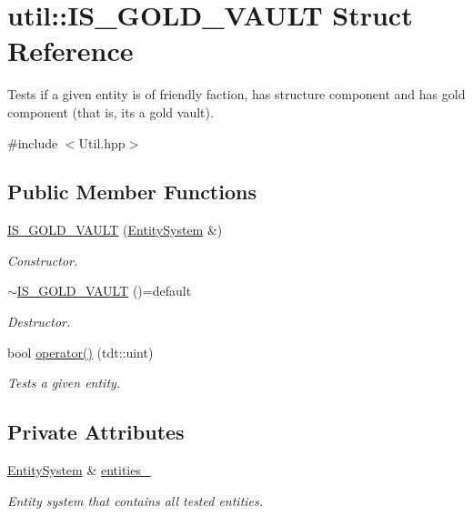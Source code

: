 \hypertarget{structutil_1_1_i_s___g_o_l_d___v_a_u_l_t}{}\section{util\+:\+:I\+S\+\_\+\+G\+O\+L\+D\+\_\+\+V\+A\+U\+LT Struct Reference}
\label{structutil_1_1_i_s___g_o_l_d___v_a_u_l_t}


Tests if a given entity is of friendly faction, has structure component and has gold component (that is, it\textquotesingle{}s a gold vault).  




{\ttfamily \#include $<$Util.\+hpp$>$}

\subsection*{Public Member Functions}
\begin{DoxyCompactItemize}
\item 
\hyperlink{structutil_1_1_i_s___g_o_l_d___v_a_u_l_t_ac01be3840c426cce0fa02387141b1cd1}{I\+S\+\_\+\+G\+O\+L\+D\+\_\+\+V\+A\+U\+LT} (\hyperlink{class_entity_system}{Entity\+System} \&)
\begin{DoxyCompactList}\small\item\em Constructor. \end{DoxyCompactList}\item 
\hyperlink{structutil_1_1_i_s___g_o_l_d___v_a_u_l_t_a35e9d685a4c8cdb03f619c14c02d930c}{$\sim$\+I\+S\+\_\+\+G\+O\+L\+D\+\_\+\+V\+A\+U\+LT} ()=default
\begin{DoxyCompactList}\small\item\em Destructor. \end{DoxyCompactList}\item 
bool \hyperlink{structutil_1_1_i_s___g_o_l_d___v_a_u_l_t_a081dfc7d8fec36e9199a72e7abaaf443}{operator()} (tdt\+::uint)
\begin{DoxyCompactList}\small\item\em Tests a given entity. \end{DoxyCompactList}\end{DoxyCompactItemize}
\subsection*{Private Attributes}
\begin{DoxyCompactItemize}
\item 
\hyperlink{class_entity_system}{Entity\+System} \& \hyperlink{structutil_1_1_i_s___g_o_l_d___v_a_u_l_t_a69fd1690e96bd7d1d5faaa8972087497}{entities\+\_\+}
\begin{DoxyCompactList}\small\item\em Entity system that contains all tested entities. \end{DoxyCompactList}\end{DoxyCompactItemize}



